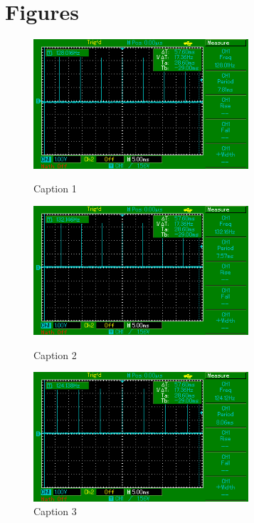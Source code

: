 \chapter{Figures}
\vspace{-4cm}
\begin{figure}[HT!]
	\centering
	\includegraphics[keepaspectratio,width=8cm]{fig/osc-no-adjust.png}
	\caption{Caption 1}

	\includegraphics[keepaspectratio,width=8cm]{fig/osc-speed-up.png}
	\caption{Caption 2}

	\includegraphics[keepaspectratio,width=8cm]{fig/osc-slow-down.png}
	\caption{Caption 3}
\end{figure}


